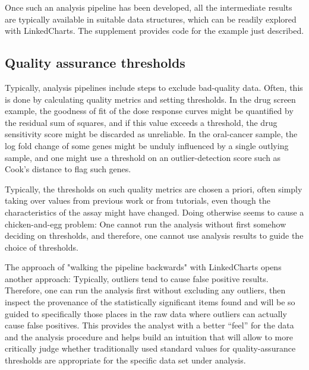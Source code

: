 \documentclass[twocolumn,10pt]{article}
\begin{document}
Once such an analysis pipeline has been developed, all the intermediate results are typically available in suitable data structures, which can be readily explored with LinkedCharts. The supplement provides code for the example just described.

\subsection{Quality assurance thresholds}

Typically, analysis pipelines include steps to exclude bad-quality data. Often, this is done by calculating quality metrics and setting thresholds. In the drug screen example, the goodness of fit of the dose response curves might be quantified by the residual sum of squares, and if this value exceeds a threshold, the drug sensitivity score might be discarded as unreliable. In the oral-cancer sample, the log fold change of some genes might be unduly influenced by a single outlying sample, and one might use a threshold on an outlier-detection score such as Cook's distance to flag such genes.

Typically, the thresholds on such quality metrics are chosen a priori, often simply taking over values from previous work or from tutorials, even though the characteristics of the assay might have changed. Doing otherwise seems to cause a chicken-and-egg problem: One cannot run the analysis without first somehow deciding on thresholds, and therefore, one cannot use analysis results to guide the choice of thresholds.

The approach of "walking the pipeline backwards" with LinkedCharts opens another approach: Typically, outliers tend to cause false positive results. Therefore, one can run the analysis first without excluding any outliers, then inspect the provenance of the statistically significant items found and will be so guided to specifically those places in the raw data where outliers can actually cause false positives. This provides the analyst with a better ``feel'' for the data and the analysis procedure and helps build an intuition that will allow to more critically judge whether traditionally used standard values for quality-assurance thresholds are appropriate for the specific data set under analysis. 
\end{document}
